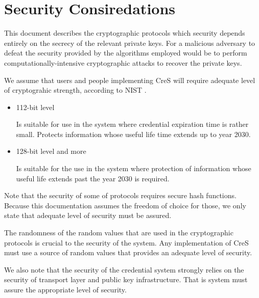 \clearpage



\section{Security Consiredations}

This document describes the cryptographic protocols which security depends entirely on the secrecy of the relevant private keys. For a malicious adversary to defeat the security provided by the algorithms employed would be to perform computationally-intensive cryptographic attacks to recover the private keys.

We assume that users and people implementing CreS will require adequate level of cryptograhic strength, according to NIST \cite{nist-keys}.
\begin{itemize}[label=$\circ$]
    \item 112-bit level
    
    Is suitable for use in the system where credential expiration time is rather small. Protects information whose useful life time extends up to year 2030. 
    
    \item 128-bit level and more
    
    Is suitable for the use in the system where protection of information whose useful life extends past the year 2030 is required.
\end{itemize}

Note that the security of some of protocols requires secure hash functions. Because this documentation assumes the freedom of choice for those, we only state that adequate level of security must be assured.

The randomness of the random values that are used in the cryptographic protocols is crucial to the security of the system. Any implementation of CreS must use a source of random values that provides an adequate level of security.

We also note that the security of the credential system strongly relies on the security of transport layer and public key infrastructure. That is system must assure the appropriate level of security.
